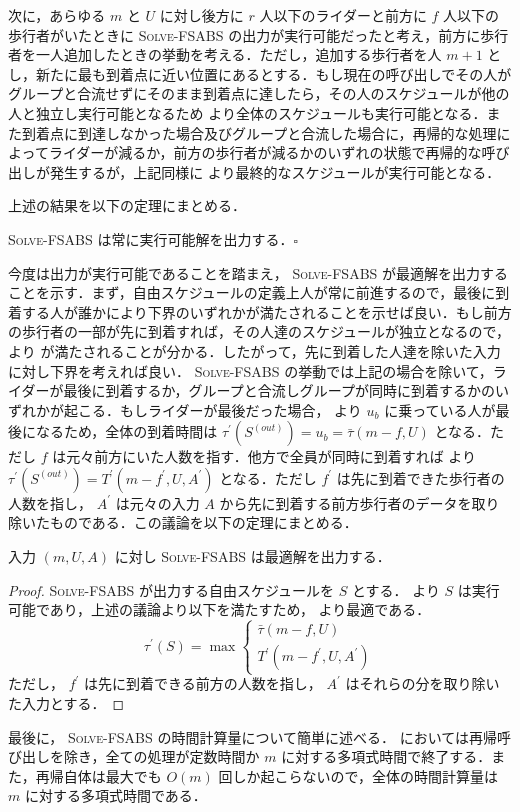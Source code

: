 次に，あらゆる $m$ と $U$ に対し後方に $r$ 人以下のライダーと前方に $f$ 人以下の歩行者がいたときに \textsc{Solve-FSABS} の出力が実行可能だったと考え，前方に歩行者を一人追加したときの挙動を考える．ただし，追加する歩行者を人 $m + 1$ とし，新たに最も到着点に近い位置にあるとする．もし現在の呼び出しでその人がグループと合流せずにそのまま到着点に達したら，その人のスケジュールが他の人と独立し実行可能となるため  より全体のスケジュールも実行可能となる．また到着点に到達しなかった場合及びグループと合流した場合に，再帰的な処理によってライダーが減るか，前方の歩行者が減るかのいずれの状態で再帰的な呼び出しが発生するが，上記同様に  より最終的なスケジュールが実行可能となる．

上述の結果を以下の定理にまとめる．

\begin{theorem}\label{theorem:solve-fsabs-is-feasible}
  \textsc{Solve-FSABS} は常に実行可能解を出力する．\hfill $\square$
\end{theorem}


今度は出力が実行可能であることを踏まえ， \textsc{Solve-FSABS} が最適解を出力することを示す．まず，自由スケジュールの定義上人が常に前進するので，最後に到着する人が誰かにより下界のいずれかが満たされることを示せば良い．もし前方の歩行者の一部が先に到着すれば，その人達のスケジュールが独立となるので，  より  が満たされることが分かる．したがって，先に到着した人達を除いた入力に対し下界を考えれば良い． \textsc{Solve-FSABS} の挙動では上記の場合を除いて，ライダーが最後に到着するか，グループと合流しグループが同時に到着するかのいずれかが起こる．もしライダーが最後だった場合，  より $u_b$ に乗っている人が最後になるため，全体の到着時間は $\tau^\prime(S^{(out)}) = u_b = \bar\tau(m - f, U)$ となる．ただし $f$ は元々前方にいた人数を指す．他方で全員が同時に到着すれば  より $\tau^\prime(S^{(out)}) = T^\prime(m - f^\prime, U, A^\prime)$ となる．ただし $f^\prime$ は先に到着できた歩行者の人数を指し， $A^{\prime}$ は元々の入力 $A$ から先に到着する前方歩行者のデータを取り除いたものである．この議論を以下の定理にまとめる．

\begin{theorem}
  入力 $(m, U, A)$ に対し \textsc{Solve-FSABS} は最適解を出力する．
\end{theorem}
\begin{proof}
  \textsc{Solve-FSABS} が出力する自由スケジュールを $S$ とする．  より $S$ は実行可能であり，上述の議論より以下を満たすため，  より最適である．
  \begin{equation}
    \tau^\prime(S) = \max \begin{cases}
      \bar\tau(m - f, U) \\
      T^\prime(m - f^\prime, U, A^\prime)
    \end{cases}
  \end{equation}
  ただし， $f^\prime$ は先に到着できる前方の人数を指し， $A^\prime$ はそれらの分を取り除いた入力とする．
\end{proof}

最後に， \textsc{Solve-FSABS} の時間計算量について簡単に述べる．  においては再帰呼び出しを除き，全ての処理が定数時間か $m$ に対する多項式時間で終了する．また，再帰自体は最大でも $O(m)$ 回しか起こらないので，全体の時間計算量は $m$ に対する多項式時間である．